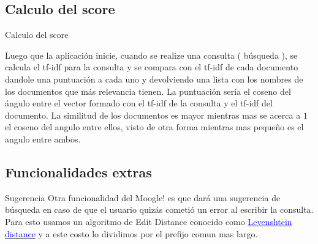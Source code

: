 \documentclass[11pt]{beamer}
\begin{document}
\subsection{Calculo del score}

\begin{frame}{Calculo del score}
    
    Luego que la aplicación inicie, cuando se realize una consulta ( búsqueda ), se calcula el tf-idf para la consulta y se compara con el tf-idf de cada documento dandole una puntuación a cada uno y devolviendo una lista con los nombres de los documentos que más relevancia tienen. La puntuación sería el coseno del ángulo entre el vector formado con el tf-idf de la consulta y el tf-idf del documento. La similitud de los documentos es mayor mientras mas se acerca a $1$ el coseno del angulo entre ellos, visto de otra forma mientras mas pequeño es el angulo entre ambos.
    
\end{frame}

\subsection{Funcionalidades extras}

\begin{frame}{Sugerencia}
    Otra funcionalidad del Moogle! es que dará una sugerencia de búsqueda en caso de que el usuario quizás cometió un error al escribir la consulta. Para esto usamos un algoritmo de Edit Distance conocido como \href{https://es.wikipedia.org/wiki/Distancia_de_Levenshtein}{\textcolor{blue}{Levenshtein distance}} y a este costo lo dividimos por el prefijo comun mas largo.
    
\end{frame}
\end{document}

